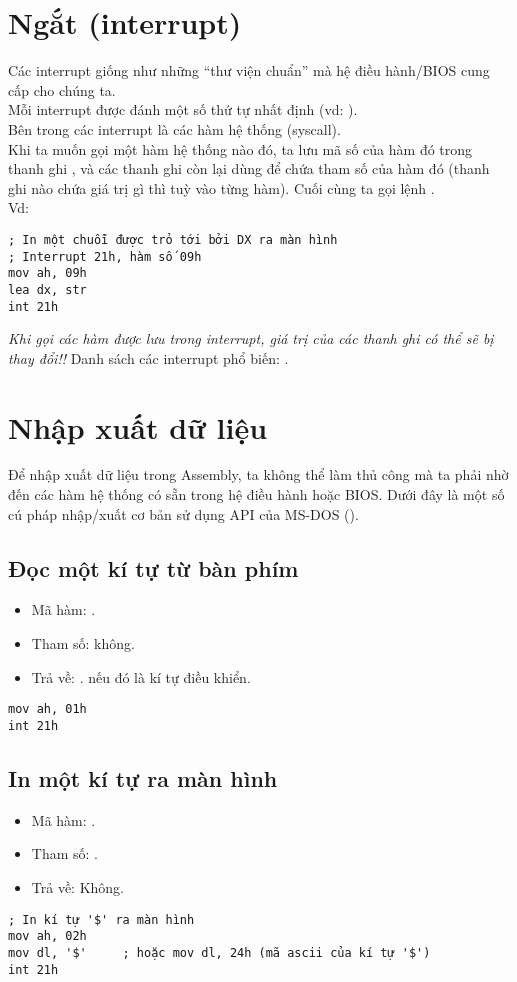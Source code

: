 \documentclass[main.tex]{subfiles}
\begin{document}
\section{Ngắt (interrupt)}
Các interrupt giống như những ``thư viện chuẩn'' mà hệ điều hành/BIOS cung cấp cho chúng ta. \\
Mỗi interrupt được đánh một số thứ tự nhất định (vd: ).\\
Bên trong các interrupt là các hàm hệ thống (syscall).\\
Khi ta muốn gọi một hàm hệ thống nào đó, ta lưu mã số của hàm đó trong thanh ghi , và các thanh ghi còn lại dùng để chứa tham số của hàm đó (thanh ghi nào chứa giá trị gì thì tuỳ vào từng hàm). Cuối cùng ta gọi lệnh .\\
Vd:
\begin{verbatim}
; In một chuỗi được trỏ tới bởi DX ra màn hình 
; Interrupt 21h, hàm số 09h
mov ah, 09h 
lea dx, str 
int 21h
\end{verbatim} 
\textit{Khi gọi các hàm được lưu trong interrupt, giá trị của các thanh ghi có thể sẽ bị thay đổi!!}
Danh sách các interrupt phổ biến: \href{https://jbwyatt.com/253/emu/8086_bios_and_dos_interrupts.html}{}.

\section{Nhập xuất dữ liệu} \label{sec:nhapxuatdl}
Để nhập xuất dữ liệu trong Assembly, ta không thể làm thủ công mà ta phải nhờ đến các hàm hệ thống có sẵn trong hệ điều hành hoặc BIOS. Dưới đây là một số cú pháp nhập/xuất cơ bản sử dụng API của MS-DOS ().

\subsection{Đọc một kí tự từ bàn phím}
\begin{itemize}
    \item Mã hàm: .
    \item Tham số: không.
    \item Trả về: .  nếu đó là kí tự điều khiển.
\end{itemize}
\begin{verbatim}
mov ah, 01h 
int 21h
\end{verbatim}

\subsection{In một kí tự ra màn hình}
\begin{itemize}
    \item Mã hàm: .
    \item Tham số: .
    \item Trả về: Không.
\end{itemize}
\begin{verbatim}
; In kí tự '$' ra màn hình 
mov ah, 02h 
mov dl, '$'     ; hoặc mov dl, 24h (mã ascii của kí tự '$')
int 21h
\end{verbatim}
\end{document}
